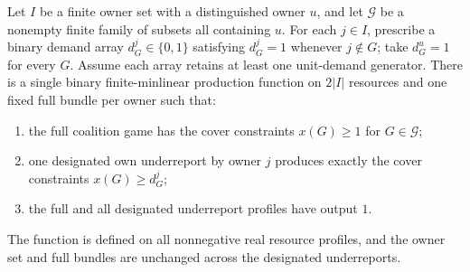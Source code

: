 \begin{lemma}
\label{lem:realization}
Let $I$ be a finite owner set with a distinguished owner $u$, and let
$\mathcal G$ be a nonempty finite family of subsets all containing $u$.
For each $j\in I$, prescribe a binary demand array
$d_G^j\in\{0,1\}$ satisfying $d_G^j=1$ whenever $j\notin G$;
take $d_G^u=1$ for every $G$.  Assume each array retains at least one
unit-demand generator.  There is a single binary finite-minlinear
production function on $2|I|$ resources and one fixed full bundle per
owner such that:
\begin{enumerate}
\item the full coalition game has the cover constraints
      $x(G)\ge1$ for $G\in\mathcal G$;
\item one designated own underreport by owner $j$ produces exactly the
      cover constraints $x(G)\ge d_G^j$;
\item the full and all designated underreport profiles have output $1$.
\end{enumerate}
The function is defined on all nonnegative real resource profiles, and
the owner set and full bundles are unchanged across the designated
underreports.
\end{lemma}
